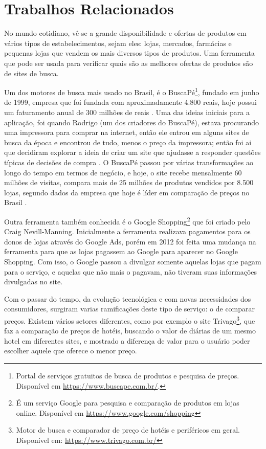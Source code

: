 \section{Trabalhos Relacionados}
No mundo cotidiano, vê-se a grande disponibilidade e ofertas de produtos em vários tipos de estabelecimentos, sejam eles: lojas, mercados, farmácias e pequenas lojas que vendem os mais diversos tipos de produtos. Uma ferramenta que pode ser usada para verificar quais são as melhores ofertas de produtos são de sites de busca.

Um dos motores de busca mais usado no Brasil, é o BuscaPé\footnote{Portal de serviços gratuitos de busca de produtos e pesquisa de preços. Disponível em \url{https://www.buscape.com.br/}.}, fundado em junho de 1999, empresa que foi fundada com aproximadamente 4.800 reais, hoje possui um faturamento anual de 300 milhões de reais \cite{EmídiaFelipe2017BUSCAPÉ}. Uma das ideias iniciais para a aplicação, foi quando Rodrigo (um dos criadores do BuscaPé), estava procurando uma impressora para comprar na internet, então ele entrou em alguns sites de busca da época e encontrou de tudo, menos o preço da impressora; então foi ai que decidiram explorar a ideia de criar um site que ajudasse a responder questões típicas de decisões de compra \cite{Arruda2011BuscaPé}. O BuscaPé passou por várias transformações ao longo do tempo em termos de negócio, e hoje, o site recebe mensalmente 60 milhões de visitas, compara mais de 25 milhões de produtos vendidos por 8.500 lojas, segundo dados da empresa que hoje é líder em comparação de preços no Brasil \cite{HELOÍSA2017Startups}.

Outra ferramenta também conhecida é o Google Shopping\footnote{É um serviço Google para pesquisa e comparação de produtos em lojas online. Disponível em \url{https://www.google.com/shopping}} que foi criado pelo Craig Nevill-Manning. Inicialmente a ferramenta realizava pagamentos para os donos de lojas através do Google Ads, porém em 2012 foi feita uma mudança na ferramenta para que as lojas pagassem ao Google para aparecer no Google Shopping. Com isso, o Google passou a divulgar somente aquelas lojas que pagam para o serviço, e aquelas que não mais o pagavam, não tiveram suas informações divulgadas no site.

Com o passar do tempo, da evolução tecnológica e com novas necessidades dos consumidores, surgiram varias ramificações deste tipo de serviço: o de comparar preços. Existem vários setores diferentes, como por exemplo o site Trivago\footnote{Motor de busca e comparador de preço de hotéis e periféricos em geral. Disponível em: \url{https://www.trivago.com.br/}}, que faz a comparação de preços de hotéis, buscando o valor de diárias de um mesmo hotel em diferentes sites, e mostrado a diferença de valor para o usuário poder escolher aquele que oferece o menor preço.

